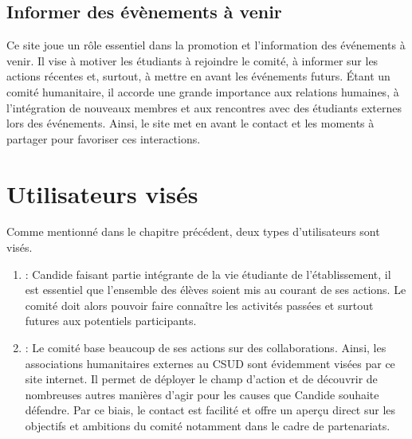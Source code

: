 \documentclass[a4,10pt,french]{sphinxmanual}
\begin{document}
\subsection{Informer des évènements à venir}
\label{\detokenize{introduction:informer-des-evenements-a-venir}}
\sphinxAtStartPar
Ce site joue un rôle essentiel dans la promotion et l’information des événements à venir. Il vise à motiver les étudiants à rejoindre le comité, à informer sur les actions récentes et, surtout, à mettre en avant les événements futurs. Étant un comité humanitaire, il accorde une grande importance aux relations humaines, à l’intégration de nouveaux membres et aux rencontres avec des étudiants externes lors des événements. Ainsi, le site met en avant le contact et les moments à partager pour favoriser ces interactions.


\section{Utilisateurs visés}
\label{\detokenize{introduction:utilisateurs-vises}}
\sphinxAtStartPar
Comme mentionné dans le chapitre précédent, deux types d’utilisateurs sont visés.
\begin{enumerate}
%
\item {} 
\sphinxAtStartPar
{}: Candide faisant partie intégrante de la vie étudiante de l’établissement, il est essentiel que l’ensemble des élèves soient mis au courant de ses actions. Le comité doit alors pouvoir faire connaître les activités passées et surtout futures aux potentiels participants.

\item {} 
\sphinxAtStartPar
{}: Le comité base beaucoup de ses actions sur des collaborations. Ainsi, les associations humanitaires externes au CSUD sont évidemment visées par ce site internet. Il permet de déployer le champ d’action et de découvrir de nombreuses autres manières d’agir pour les causes que Candide souhaite défendre. Par ce biais, le contact est facilité et offre un aperçu direct sur les objectifs et ambitions du comité notamment dans le cadre de partenariats.

\end{enumerate}
\end{document}
